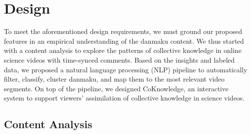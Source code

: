 \section{Design}

To meet the aforementioned design requirements, we must ground our proposed features in an empirical understanding of the danmaku content. We thus started with a content analysis to explore the patterns of collective knowledge in online science videos with time-synced comments. Based on the insights and labeled data, we proposed a natural language processing (NLP) pipeline to automatically filter, classify, cluster danmaku, and map them to the most relevant video segments. On top of the pipeline, we designed CoKnowledge, an interactive system to support viewers' assimilation of collective knowledge in science videos.


\subsection{Content Analysis}
\label{content-analysis}

